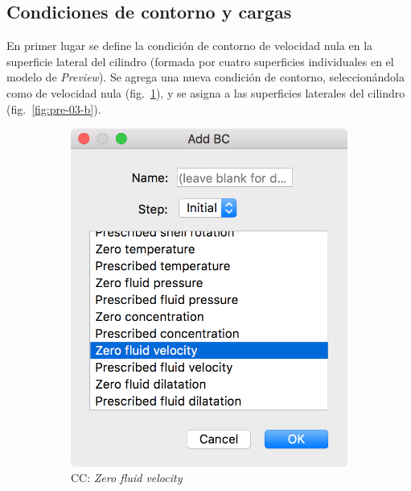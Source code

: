 \subsection{Condiciones de contorno y cargas}

En primer lugar se define la condición de contorno de velocidad nula en la superficie lateral del cilindro (formada por cuatro superficies individuales en el modelo de \emph{Preview}).
Se agrega una nueva condición de contorno, seleccionándola como de velocidad nula (fig.~\ref{fig:pre-03-a}), y se asigna a las superficies laterales del cilindro (fig.~\ref{fig:pre-03-b}).
\begin{figure}[!ht]
\centering
\begin{subfigure}[b]{0.20\textwidth}
\includegraphics[width=\linewidth]{figuras_4/03_pre-bc-zfv-1.png}
\caption{CC: \emph{Zero fluid velocity}}
\label{fig:pre-03-a}
\end{subfigure}
\hfil
\begin{subfigure}[b]{0.48\textwidth}

\end{subfigure}
\end{figure}
